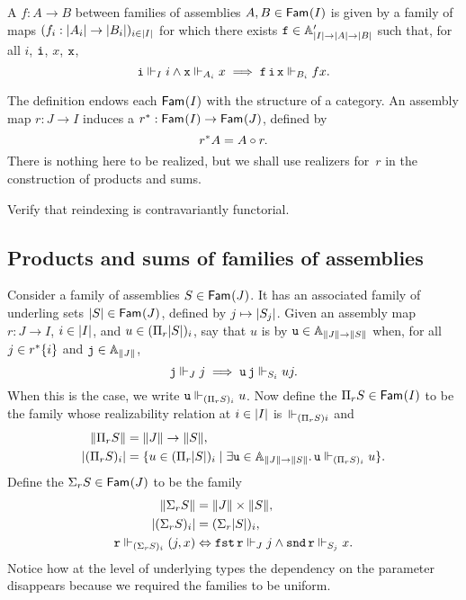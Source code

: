 \begin{definition}
  A  $f : A \to B$ between families of assemblies $A, B \in \Fam{I}$ is given by a family of maps $(f_i : \S{A_i} \to \S{B_i})_{i \in \S{I}}$
  for which there exists $\R{f} \in \subAtyp{\S{I} \to \S{A} \to \S{B}}$ such that,
  for all $i$, $\R{i}$, $x$, $\R{x}$,
  \begin{equation*}
    \R{i} \rz[I] i \land \R{x} \rz[A_i] x \implies \R{f}\,\R{i}\,\R{x} \rz[B_i] f x.
  \end{equation*}
\end{definition}

The definition endows each $\Fam{I}$ with the structure of a category.
%
An assembly map $r : J \to I$ induces a  $\invim{r} : \Fam{I} \to \Fam{J}$, defined by
%
\begin{equation*}
  \invim{r} A = A \circ r.
\end{equation*}
%
There is nothing here to be realized, but we shall use realizers for~$r$ in the construction of products and sums.

\begin{exercise}
  Verify that reindexing is contravariantly functorial.
\end{exercise}


\subsection{Products and sums of families of assemblies}
\label{sec:depend-sums-prod-asm}

Consider a family of assemblies $S \in \Fam{J}$. It has an associated family of underling sets $\S{S} \in \Fam{J}$, defined by $j \mapsto \S{S_j}$. Given an assembly map $r : J \to I$, $i \in \S{I}$, and $u \in (\Pi_r \S{S})_i$, say that $u$ is  by $\R{u} \in \Atyp{\T{J} \to \T{S}}$ when, for all $j \in \invim{r} \set{i}$ and $\R{j} \in \Atyp{\T{J}}$,
%
\begin{equation*}
  \R{j} \rz[J] j \implies
  \R{u}\,\R{j} \rz[S_i] u j.
\end{equation*}
%
When this is the case, we write $\R{u} \rz[(\Pi_r S)_i] u$.
%
Now define the  $\Pi_r S \in \Fam{I}$ to be the family whose realizability relation at $i \in \S{I}$ is~$\rz[(\Pi_r S) i]$ and
%
\begin{align*}
  \T{\Pi_r S} &= \T{J} \to \T{S}, \\
  \S{(\Pi_r S)_i} &= 
    \set{ u \in (\Pi_r \S{S})_i \such
       \some{\R{u} \in \Atyp{\T{J} \to \T{S}}} \R{u} \rz[(\Pi_r S)_i] u
    }.
\end{align*}
%
Define the  $\Sigma_r S \in \Fam{J}$ to be the family
%
\begin{align*}
  \T{\Sigma_r S} &= \T{J} \times \T{S}, \\
  \S{(\Sigma_r S)_i} &= (\Sigma_r \S{S})_i, \\
  \R{r} \rz[(\Sigma_r S)_i] (j, x) &\liff
  \combFst\,\R{r} \rz[J] j \land \combSnd\,\R{r} \rz[S_j] x.
\end{align*}
%
Notice how at the level of underlying types the dependency on the
parameter disappears because we required the families to be
uniform.

